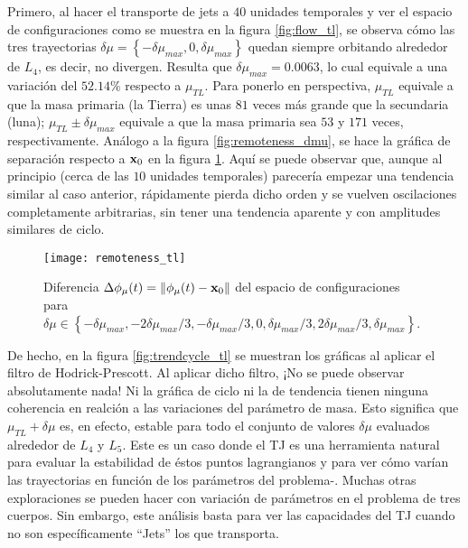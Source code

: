 Primero, al hacer el transporte de jets a $40$ unidades temporales y ver el espacio de configuraciones como se muestra en la figura \ref{fig:flow_tl}, se observa cómo las tres trayectorias $\delta\mu = \left\lbrace -\delta\mu_{max}, 0, \delta\mu_{max} \right\rbrace$ quedan siempre orbitando alrededor de $L_4$, es decir, no divergen. Resulta que $\delta\mu_{max} = 0.0063 $, lo cual equivale a una variación del $52.14 \%$ respecto a $\mu_{TL}$. Para ponerlo en perspectiva, $\mu_{TL}$ equivale a que la masa primaria (la Tierra) es unas $81$ veces más grande que la secundaria (luna); $\mu_{TL} \pm \delta\mu_{max}$ equivale a que la masa primaria sea $53$ y $171$ veces, respectivamente. Análogo a la figura \ref{fig:remoteness_dmu}, se hace la gráfica de separación respecto a $\mathbf{x}_0$ en la figura \ref{fig:remoteness_tl}. Aquí se puede observar que, aunque al principio (cerca de las $10$ unidades temporales) parecería empezar una tendencia similar al caso anterior, rápidamente pierda dicho orden y se vuelven oscilaciones completamente arbitrarias, sin tener una tendencia aparente y con amplitudes similares de ciclo.

\begin{figure}
 \centering
 \texttt{[image: remoteness\_tl]}
 \caption{Diferencia $\Delta\phi_\mu(t) = \left\lVert \phi_\mu(t) - \mathbf{x}_0 \right\rVert$ del espacio de configuraciones para $\delta\mu \in \left\lbrace -\delta\mu_{max}, -2\delta\mu_{max}/3, -\delta\mu_{max}/3, 0, \delta\mu_{max}/3, 2\delta\mu_{max}/3, \delta\mu_{max}  \right\rbrace$.}
 \label{fig:remoteness_tl}
\end{figure}

De hecho, en la figura \ref{fig:trendcycle_tl} se muestran los gráficas al aplicar el filtro de Hodrick-Prescott. Al aplicar dicho filtro, ¡No se puede observar absolutamente nada! Ni la gráfica de ciclo ni la de tendencia tienen ninguna coherencia en realción a las variaciones del parámetro de masa. Esto significa que $\mu_{TL} + \delta\mu$ es, en efecto, estable para todo el conjunto de valores $\delta\mu$ evaluados alrededor de $L_4$ y $L_5$. Este es un caso donde el TJ es una herramienta natural para evaluar la estabilidad de éstos puntos lagrangianos y para ver cómo varían las trayectorias en función de los parámetros del problema-. Muchas otras exploraciones se pueden hacer con variación de parámetros en el problema de tres cuerpos. Sin embargo, este análisis basta para ver las capacidades del TJ cuando no son específicamente ``Jets'' los que transporta.

